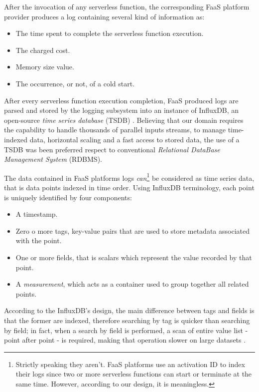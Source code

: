 \documentclass[12pt,a4paper]{report}
\begin{document}
After the invocation of any serverless function, the corresponding FaaS platform provider produces a log containing several kind of information as:   

\begin{itemize}
	\item The time spent to complete the serverless function execution.
	\item The charged cost.
	\item Memory size value.
	\item The occurrence, or not, of a cold start.
\end{itemize}

After every serverless function execution completion, FaaS produced logs are parsed and stored by the logging subsystem into an instance of InfluxDB, an open-source \textit{time series database} (TSDB) \cite{influx}. Believing that our domain requires the capability to handle thousands of parallel inputs streams, to manage time-indexed data, horizontal scaling and a fast access to stored data, the use of a TSDB was been preferred respect to conventional \textit{Relational DataBase Management System} (RDBMS).  

The data contained in FaaS platforms logs \textit{can}\footnote{Strictly speaking they aren't. FaaS platforms use an activation ID to index their logs since two or more serverless functions can start or terminate at the same time. However, according to our design, it is meaningless.} be considered as time series data, that is data points indexed in time order. Using InfluxDB terminology, each point is uniquely identified by four components:

\begin{itemize}
	\item A timestamp.
	
	\item Zero o more tags, key-value pairs that are used to store metadata associated with the point. 
	
	\item One or more fields, that is scalars which represent the value recorded by that point.
	
	\item A \textit{measurement}, which acts as a container used to group together all related points.
	
\end{itemize}

According to the InfluxDB's design, the main difference between tags and fields is that the former are indexed, therefore searching by tag is quicker than searching by field; in fact, when a search by field is performed, a scan of entire value list - point after point - is required, making that operation slower on large datasets \cite{influx}.
\end{document}
